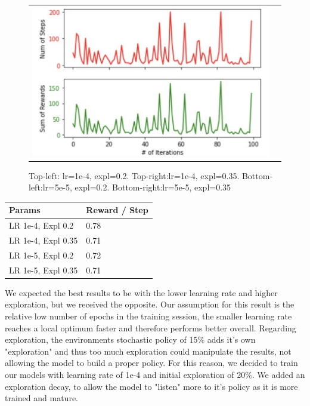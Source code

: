 \documentclass[leqno]{article}
\begin{document}
\begin{multicols}{2}
\begin{figure}[H]
\begin{tabular}{ll}
    \includegraphics[scale=0.18]{figs/hyp_lr5_exp3.jpeg}\\
  \end{tabular}
  \caption{Top-left: lr=1e-4, expl=0.2. Top-right:lr=1e-4, expl=0.35. Bottom-left:lr=5e-5, expl=0.2. Bottom-right:lr=5e-5, expl=0.35}
  \label{hyperparams}
\end{figure}

\begin{tabular}{ |p{3.5cm}|p{2.5cm}|}
 \hline
 Params & Reward / Step\\
 \hline
 \hline
 LR 1e-4, Expl 0.2 & 0.78\\
 LR 1e-4, Expl 0.35 & 0.71\\
 LR 1e-5, Expl 0.2 & 0.72\\
 LR 1e-5, Expl 0.35 & 0.71\\
 \hline
\end{tabular}

We expected the best results to be with the lower learning rate and higher exploration, but we received the opposite. Our assumption for this result is the relative low number of epochs in the training session, the smaller learning rate reaches a local optimum faster and therefore performs better overall. Regarding exploration, the environments stochastic policy of 15\% adds it's own "exploration" and thus too much exploration could manipulate the results, not allowing the model to build a proper policy. For this reason, we decided to train our models with learning rate of 1e-4 and initial exploration of 20\%. We added an exploration decay, to allow the model to "listen" more to it's policy as it is more trained and mature.


\end{multicols}
\end{document}
